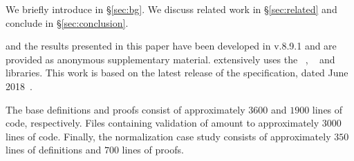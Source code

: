 We briefly introduce \gql in \S\ref{sec:bg}. 
We discuss related work in \S\ref{sec:related} and conclude in \S\ref{sec:conclusion}.

\gcoql and the results presented in this paper have been developed in \coq v.8.9.1 and are provided as anonymous supplementary material. 
\gcoql extensively uses the 
\mathcomp~\cite{mathcomp}, \ssreflect~\cite{ssreflect} and \equations~\cite{equations} libraries. 
This work is based on the latest release of the \gql specification, dated June 2018~\cite{gqlspec}.

The base definitions and proofs consist of approximately $3600$ and $1900$ lines of code, respectively.
Files containing validation of \gcoql amount to approximately $3000$ lines of code. 
Finally, the normalization case study consists of approximately $350$ lines of definitions and $700$ lines of proofs.




